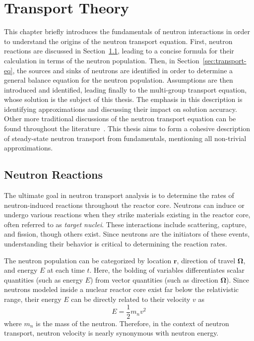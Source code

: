 \chapter{Transport Theory}
\label{chap:transport}

This chapter briefly introduces the fundamentals of neutron interactions in order to understand the origins of the neutron transport equation. First, neutron reactions are discussed in Section~\ref{sec:transport-fundamentals}, leading to a concise formula for their calculation in terms of the neutron population. Then, in Section~\ref{sec:transport-eq}, the sources and sinks of neutrons are identified in order to determine a general balance equation for the neutron population. Assumptions are then introduced and identified, leading finally to the multi-group transport equation, whose solution is the subject of this thesis. The emphasis in this description is identifying approximations and discussing their impact on solution accuracy. Other more traditional discussions of the neutron transport equation can be found throughout the literature~\cite{henry, duderstadt, duderstadt-martin, bell1967transport, hebert2009applied}. This thesis aims to form a cohesive description of steady-state neutron transport from fundamentals, mentioning all non-trivial approximations.

\section{Neutron Reactions}
\label{sec:transport-fundamentals}

The ultimate goal in neutron transport analysis is to determine the rates of neutron-induced reactions throughout the reactor core. Neutrons can induce or undergo various reactions when they strike materials existing in the reactor core, often referred to as \textit{target nuclei}. These interactions include scattering, capture, and fission, though others exist. Since neutrons are the initiators of these events, understanding their behavior is critical to determining the reaction rates.

The neutron population can be categorized by location $\mathbf{r}$, direction of travel $\mathbf{\Omega}$, and energy $E$ at each time $t$. Here, the bolding of variables differentiates scalar quantities (such as energy $E$) from vector quantities (such as direction $\mathbf{\Omega}$). Since neutrons modeled inside a nuclear reactor core exist far below the relativistic range, their energy $E$ can be directly related to their velocity $v$ as
\begin{equation}
E = \frac{1}{2} m_n v^2
\end{equation}
where $m_n$ is the mass of the neutron. Therefore, in the context of neutron transport, neutron velocity is nearly synonymous with neutron energy.


